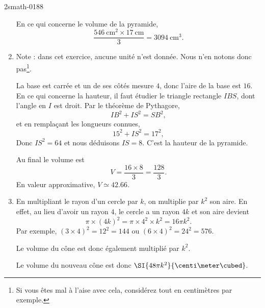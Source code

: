 \begin{corrige}{2smath-0188}
\begin{enumerate}
        En ce qui concerne le volume de la pyramide,
        \begin{equation}
            \frac{ \SI{546}{\centi\meter\squared}\times \SI{17}{\centi\meter} }{ 3 }=\SI{3094}{\centi\meter\cubed}.
        \end{equation}
\item

    Note : dans cet exercice, aucune unité n'est donnée. Nous n'en notons donc pas\footnote{Si vous êtes mal à l'aise avec cela, considérez tout en centimètres par exemple.}.

    La base est carrée et un de ses côtés mesure \( 4\), donc l'aire de la base est \( 16\). En ce qui concerne la hauteur, il faut étudier le triangle rectangle \( IBS\), dont l'angle en \( I\) est droit. Par le théorème de Pythagore,
    \begin{equation}
        IB^2+IS^2=SB^2,
    \end{equation}
    et en remplaçant les longueurs connues,
    \begin{equation}
        15^2+IS^2=17^2,
    \end{equation}
    Donc \( IS^2=64\) et nous déduisons \( IS=8\). C'est la hauteur de la pyramide.

    Au final le volume est
    \begin{equation}
        V=\frac{ 16\times 8 }{ 3 }=\frac{ 128 }{ 3 }.
    \end{equation}
    En valeur approximative, \( V\simeq 42.66\).

    \item
    En multipliant le rayon d'un cercle par \( k\), on multiplie par \( k^2\) son aire. En effet, au lieu d'avoir un rayon \( 4\), le cercle a un rayon \( 4k\) et son aire devient
    \begin{equation}
        \pi\times (4k)^2=\pi\times 4^2\times k^2=16\pi k^2.
    \end{equation}
    Par exemple, \( (3\times 4)^2=12^2=144\) ou \( (6\times 4)^2=24^2=576\).

    Le volume du cône est donc également multiplié par \( k^2\).

    Le volume du nouveau cône est donc \( \SI{48\pi k^2}{\centi\meter\cubed}\).
\end{enumerate}

\end{corrige}
